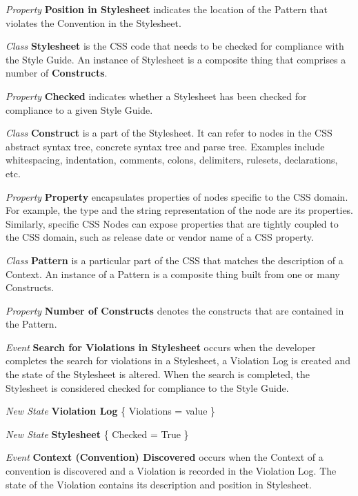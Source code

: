 \begin{description}
\textit{Property} \textbf{Position in Stylesheet} indicates the location of the Pattern that violates the Convention in the Stylesheet. 


\item\textit{Class} \textbf{Stylesheet} is the CSS code that needs to be checked for compliance with the Style Guide. An instance of Stylesheet is a composite thing that comprises a number of \textbf{Constructs}.

\textit{Property} \textbf{Checked} indicates whether a Stylesheet has been checked for compliance to a given Style Guide. 


\item\textit{Class} \textbf{Construct} is a part of the Stylesheet. It can refer to nodes in the CSS abstract syntax tree, concrete syntax tree and parse tree. Examples include whitespacing, indentation, comments, colons, delimiters, rulesets, declarations, etc.

\textit{Property} \textbf{Property} encapsulates properties of nodes specific to the CSS domain. For example, the type and the string representation of the node are its properties. Similarly, specific CSS Nodes can expose properties that are tightly coupled to the CSS domain, such as release date or vendor name of a CSS property.


\item\textit{Class} \textbf{Pattern} is a particular part of the CSS that matches the description of a Context. An instance of a Pattern is a composite thing built from one or many Constructs.

\textit{Property} \textbf{Number of Constructs} denotes the constructs that are contained in the Pattern.


\item\textit{Event} \textbf{Search for Violations in Stylesheet} occurs when the developer completes the search for violations in a Stylesheet, a Violation Log is created and the state of the Stylesheet is altered. When the search is completed, the Stylesheet is considered checked for compliance to the Style Guide.

\textit{New State} \textbf{Violation Log} \{ Violations = value \}

\textit{New State} \textbf{Stylesheet} \{ Checked = True \}


\item\textit{Event} \textbf{Context (Convention) Discovered} occurs when the Context of a convention is discovered and a Violation is recorded in the Violation Log. The state of the Violation contains its description and position in Stylesheet.


\end{description}
